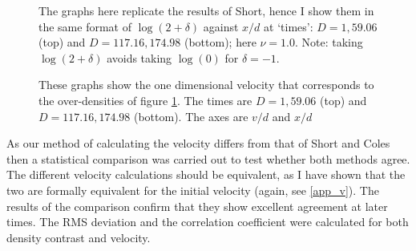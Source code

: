 \begin{figure}[htb]
   \begin{center}
     \leavevmode %
                \epsfxsize=80mm
                 \nolinebreak
      		\epsfxsize=80mm

                \epsfxsize=80mm
                 \nolinebreak
      		\epsfxsize=80mm

   \end{center}
\caption{The graphs here replicate the results of Short, hence I show them in the same format of $\log(2+\delta)$ against $x/d$ at `times': $D=1, 59.06$ (top) and  $D=117.16, 174.98$ (bottom); here $\nu=1.0$. Note: taking $\log(2+\delta)$ avoids taking $\log(0)$ for $\delta=-1$.}
\label{fig.den}
\end{figure} 



\begin{figure}[htb]
   \begin{center}
     \leavevmode %
                \epsfxsize=80mm
                 \nolinebreak
      		\epsfxsize=80mm

                \epsfxsize=80mm
                 \nolinebreak
      		\epsfxsize=80mm

   \end{center}
\caption{These graphs show the one dimensional velocity that corresponds to the over-densities of figure \ref{fig.den}. The times are $D=1, 59.06$ (top) and $D=117.16, 174.98 $ (bottom). The axes are $v/d$ and $x/d$}
\label{fig.vel}
\end{figure} 

As our method of calculating the velocity differs from that of Short and Coles then a statistical comparison was carried out to test whether both methods agree. The different velocity calculations should be equivalent, as I have shown that the two are formally equivalent for the initial velocity (again, see \ref{app_v}). The results of the comparison confirm that they show excellent agreement at later times. The RMS deviation and the correlation coefficient were calculated for both density contrast and velocity.

